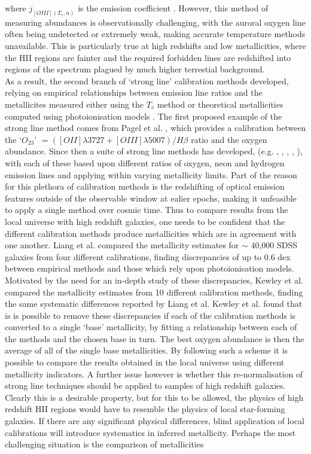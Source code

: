 \documentclass{literature}
\begin{document}
where $j_{[OIII](T_{e}, n)}$ is the emission coefficient \citep{Stasinska2002a}. However, this method of measuring abundances is observationally challenging, with the auroral oxygen line often being undetected or extremely weak, making accurate temperature methods unavailable. This is particularly true at high redshifts and low metallicities, where the HII regions are fainter and the required forbidden lines are redshifted into regions of the spectrum plagued by much higher terrestial background. \\
As a result, the second branch of `strong line' calibration methods developed, relying on empirical relationships between emission line ratios and the metallicites measured either using the $T_{e}$ method or theoretical metallicities computed using photoionisation models \citep{Kewley2002}. The first proposed example of the strong line method comes from Pagel et al. \citep{Pagel1979}, which provides a calibration between the `$O_{23}$' $ = ([OII]\lambda3727 + [OIII]\lambda5007)/H\beta$ ratio and the oxygen abundance. Since then a suite of strong line methods has developed, (e.g. \citep{Pilyugin2001}, \citep{Pettini_2004}, \citep{Pilyugin2005}, \citep{Zaritsky1994}, \citep{Kobulnicky2004}), with each of these based upon different ratios of oxygen, neon and hydrogen emission lines and applying within varying metallicity limits. Part of the reason for this plethora of calibration methods is the redshifting of optical emission features outside of the observable window at ealier epochs, making it unfeasible to apply a single method over cosmic time. Thus to compare results from the local universe with high redshift galaxies, one needs to be confident that the different calibration methods produce metallicities which are in agreement with one another. Liang et al. \citep{Liang_2006} compared the metallicity estimates for $\sim$ 40,000 SDSS galaxies from four different calibrations, finding discrepancies of up to 0.6 dex between empirical methods and those which rely upon photoionisation models. Motivated by the need for an in-depth study of these discrepancies, Kewley et al. \citep{Kewley_2008} compared the metallicity estimates from 10 different calibration methods, finding the same systematic differences reported by Liang et al. Kewley et al. found that is is possible to remove these discrepancies if each of the calibration methods is converted to a single `base' metallicity, by fitting a relationship between each of the methods and the chosen base in turn. The best oxygen abundance is then the average of all of the single base metallicities. By following such a scheme it is possible to compare the results obtained in the local universe using different metallicity indicators. A further issue however is whether this re-normalisation of strong line techniques should be applied to samples of high redshift galaxies\citep{Steidel2014}. Clearly this is a desirable property, but for this to be allowed, the physics of high redshift HII regions would have to resemble the physics of local star-forming galaxies. If there are any significant physical differences, blind application of local calibrations will introduce systematics in inferred metallicity. Perhaps the most challenging situation is the comparison of metallicities 
\end{document}
